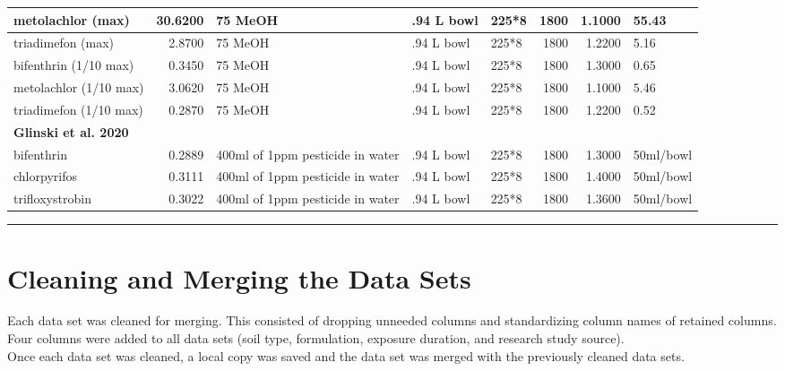 \documentclass[
]{article}
\begin{document}
\begin{table}
\begin{tabular}{l|r|l|l|l|r|r|l}
\hline
\hspace{1em}metolachlor (max) & 30.6200 & 75 MeOH & .94 L bowl & 225*8 & 1800 & 1.1000 & 55.43\\
\hline
\hspace{1em}triadimefon (max) & 2.8700 & 75 MeOH & .94 L bowl & 225*8 & 1800 & 1.2200 & 5.16\\
\hline
\hspace{1em}bifenthrin (1/10 max) & 0.3450 & 75 MeOH & .94 L bowl & 225*8 & 1800 & 1.3000 & 0.65\\
\hline
\hspace{1em}metolachlor (1/10 max) & 3.0620 & 75 MeOH & .94 L bowl & 225*8 & 1800 & 1.1000 & 5.46\\
\hline
\hspace{1em}triadimefon (1/10 max) & 0.2870 & 75 MeOH & .94 L bowl & 225*8 & 1800 & 1.2200 & 0.52\\
\hline
\multicolumn{8}{l}{\textbf{Glinski et al. 2020}}\\
\hline
\hspace{1em}bifenthrin & 0.2889 & 400ml of 1ppm pesticide in water & .94 L bowl & 225*8 & 1800 & 1.3000 & 50ml/bowl\\
\hline
\hspace{1em}chlorpyrifos & 0.3111 & 400ml of 1ppm pesticide in water & .94 L bowl & 225*8 & 1800 & 1.4000 & 50ml/bowl\\
\hline
\hspace{1em}trifloxystrobin & 0.3022 & 400ml of 1ppm pesticide in water & .94 L bowl & 225*8 & 1800 & 1.3600 & 50ml/bowl\\
\hline
\end{tabular}
\end{table}

\begin{center}\rule{0.5\linewidth}{0.5pt}\end{center}

\hypertarget{cleaning-and-merging-the-data-sets}{%
\section{\texorpdfstring{\textbf{Cleaning and Merging the Data
Sets}}{Cleaning and Merging the Data Sets}}\label{cleaning-and-merging-the-data-sets}}

Each data set was cleaned for merging. This consisted of dropping
unneeded columns and standardizing column names of retained columns.
Four columns were added to all data sets (soil type, formulation,
exposure duration, and research study source).\\
Once each data set was cleaned, a local copy was saved and the data set
was merged with the previously cleaned data sets.
\end{document}
